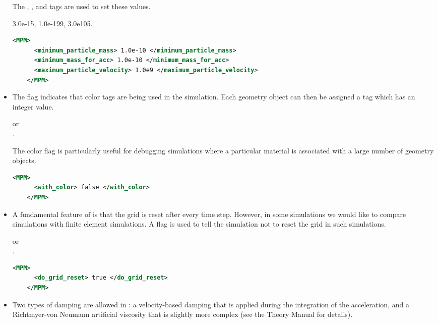 \begin{itemize}
    The , , and
     tags are used to set these values.

     3.0e-15, 1.0e-199, 3.0e105.
    \begin{lstlisting}[language=XML]
    <MPM>
      <minimum_particle_mass> 1.0e-10 </minimum_particle_mass>
      <minimum_mass_for_acc> 1.0e-10 </minimum_mass_for_acc>
      <maximum_particle_velocity> 1.0e9 </maximum_particle_velocity>
    </MPM>
    \end{lstlisting}

  \item {}  The  flag indicates that
    color tags are being used in the simulation.  Each geometry object can 
    then be assigned a  tag which has 
    an integer value.

      or \\
     .

    The color flag is particularly useful for debugging simulations where a
    particular material is associated with a large number of geometry objects.
    \begin{lstlisting}[language=XML]
    <MPM>
      <with_color> false </with_color>
    </MPM>
    \end{lstlisting}

  \item {} A fundamental feature of \MPM is that the grid is reset
    after every time step.  However, in some simulations we would like to compare
    \Vaango simulations with finite element simulations.  A 
    flag is used to tell the simulation not to reset the grid in such simulations.

      or \\
     .
    \begin{lstlisting}[language=XML]
    <MPM>
      <do_grid_reset> true </do_grid_reset>
    </MPM>
    \end{lstlisting}

  \item {}  Two types of damping are allowed in \Vaango : a
    velocity-based damping that is applied during the integration of the
    acceleration, and a Richtmyer-von Neumann artificial viscosity that
    is slightly more complex (see the Theory Manual for details).


\end{itemize}
